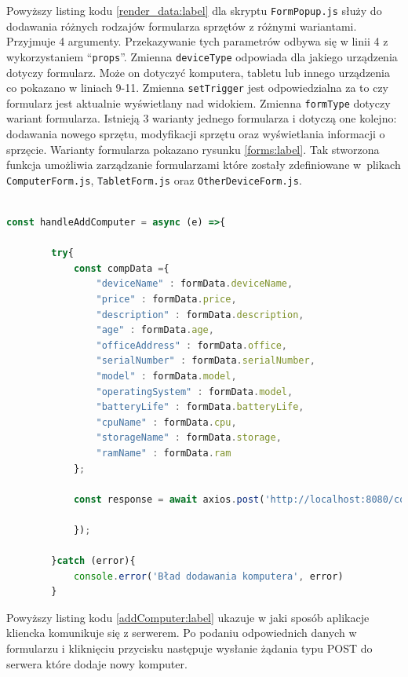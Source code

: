 Powyższy listing kodu \ref{render_data:label} dla skryptu \texttt{FormPopup.js}  służy do dodawania różnych rodzajów formularza sprzętów z różnymi wariantami. Przyjmuje 4 argumenty. Przekazywanie tych parametrów odbywa się w linii 4 z wykorzystaniem "`\texttt{props}"'. Zmienna \texttt{deviceType} odpowiada dla jakiego urządzenia dotyczy formularz. Może on dotyczyć komputera, tabletu lub innego urządzenia co pokazano w liniach 9-11. Zmienna \texttt{setTrigger} jest odpowiedzialna za to czy formularz jest aktualnie wyświetlany nad widokiem. Zmienna \texttt{formType} dotyczy wariant formularza. Istnieją 3 warianty jednego formularza i dotyczą one kolejno: dodawania nowego sprzętu, modyfikacji sprzętu oraz wyświetlania informacji o sprzęcie. Warianty formularza pokazano rysunku \ref{forms:label}. Tak stworzona funkcja umożliwia zarządzanie formularzami które zostały zdefiniowane w~plikach \texttt{ComputerForm.js}, \texttt{TabletForm.js} oraz \texttt{OtherDeviceForm.js}.

\begin{lstlisting}[language=JavaScript, style=JavaScriptStyle,  caption={Przykładowe zapytanie do serwera dla formularza komputera}, label={addComputer:label}]

const handleAddComputer = async (e) =>{

        try{
            const compData ={
                "deviceName" : formData.deviceName,
                "price" : formData.price,
                "description" : formData.description,
                "age" : formData.age,
                "officeAddress" : formData.office,
                "serialNumber" : formData.serialNumber,
                "model" : formData.model,
                "operatingSystem" : formData.model,
                "batteryLife" : formData.batteryLife,
                "cpuName" : formData.cpu,
                "storageName" : formData.storage,
                "ramName" : formData.ram
            };

            const response = await axios.post('http://localhost:8080/computers/add', compData, {

            });

        }catch (error){
            console.error('Bład dodawania komputera', error)
        }

\end{lstlisting}

Powyższy listing kodu \ref{addComputer:label} ukazuje w jaki sposób aplikacje kliencka komunikuje się z serwerem. Po podaniu odpowiednich danych w formularzu i kliknięciu przycisku następuje wysłanie żądania typu POST do serwera które dodaje nowy komputer. 

